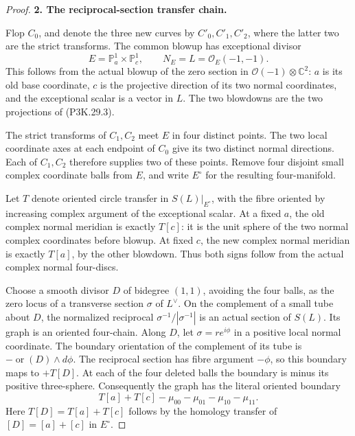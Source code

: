 \begin{proof}
\par\medskip\noindent\textbf{2. The reciprocal-section transfer chain.}\enspace

Flop \(C_0\), and denote the three new curves by \(C'_0,C'_1,C'_2\),
where the latter two are the strict transforms. The common blowup
has exceptional divisor
\[
          E=\mathbb P^1_a\times\mathbb P^1_c,\qquad
          N_E=L=\mathcal O_E(-1,-1).
                                                        \tag{P3K.29.3}
\]
This follows from the actual blowup of the zero section in
\(\mathcal O(-1)\otimes\mathbb C^2\): \(a\) is its old base
coordinate, \(c\) is the projective direction of its two normal
coordinates, and the exceptional scalar is a vector in \(L\).
The two blowdowns are the two projections of (P3K.29.3).

The strict transforms of \(C_1,C_2\) meet \(E\) in four distinct
points. The two local coordinate axes at each endpoint of \(C_0\)
give its two distinct normal directions. Each of \(C_1,C_2\)
therefore supplies two of these points. Remove four disjoint
small complex coordinate balls from \(E\), and write \(E^\circ\)
for the resulting four-manifold.

Let \(T\) denote oriented circle transfer in \(S(L)|_{E^\circ}\),
with the fibre oriented by increasing complex argument of the
exceptional scalar. At a fixed \(a\), the old complex normal
meridian is exactly \(T[c]\): it is the unit sphere of the two
normal complex coordinates before blowup. At fixed \(c\), the new
complex normal meridian is exactly \(T[a]\), by the other blowdown.
Thus both signs follow from the actual complex normal four-discs.

Choose a smooth divisor \(D\) of bidegree \((1,1)\), avoiding the
four balls, as the zero locus of a transverse section \(\sigma\)
of \(L^\vee\). On the complement of a small tube about \(D\),
the normalized reciprocal \(\sigma^{-1}/|\sigma^{-1}|\) is an
actual section of \(S(L)\). Its graph is an oriented four-chain.
Along \(D\), let \(\sigma=re^{i\phi}\) in a positive local normal
coordinate. The boundary orientation of the complement of its
tube is
\(-\operatorname{or}(D)\wedge d\phi\). The reciprocal section
has fibre argument \(-\phi\), so this boundary maps to
\(+T[D]\). At each of the four deleted balls the boundary is
minus its positive three-sphere. Consequently the graph has
the literal oriented boundary
\[
           T[a]+T[c]-\mu_{00}-\mu_{01}-\mu_{10}-\mu_{11}.
                                                        \tag{P3K.29.4}
\]
Here \(T[D]=T[a]+T[c]\) follows by the homology transfer of
\([D]=[a]+[c]\) in \(E^\circ\).


\end{proof}
